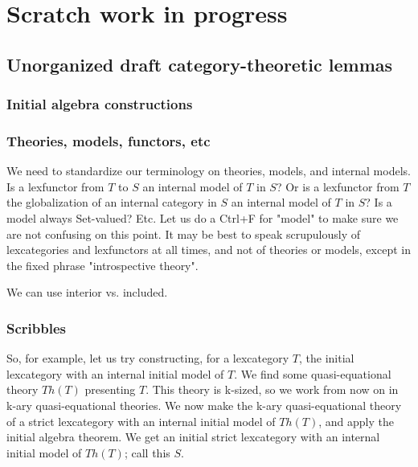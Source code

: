 \filestart

\section{Scratch work in progress}

\subsection{Unorganized draft category-theoretic lemmas}

\subsubsection{Initial algebra constructions}
\TODO

\subsubsection{Theories, models, functors, etc}
\begin{TODOblock}\label{ModelTerminology}
We need to standardize our terminology on theories, models, and internal models. Is a lexfunctor from $T$ to $S$ an internal model of $T$ in $S$? Or is a lexfunctor from $T$ the globalization of an internal category in $S$ an internal model of $T$ in $S$? Is a model always Set-valued? Etc. Let us do a Ctrl+F for "model" to make sure we are not confusing on this point. It may be best to speak scrupulously of lexcategories and lexfunctors at all times, and not of theories or models, except in the fixed phrase "introspective theory".

We can use interior vs. included.
\end{TODOblock}


\subsubsection{Scribbles}
So, for example, let us try constructing, for a lexcategory $T$, the initial lexcategory with an internal initial model of $T$. We find some quasi-equational theory $Th(T)$ presenting $T$. This theory is k-sized, so we work from now on in k-ary quasi-equational theories. We now make the k-ary quasi-equational theory of a strict lexcategory with an internal initial model of $Th(T)$, and apply the initial algebra theorem. We get an initial strict lexcategory with an internal initial model of $Th(T)$; call this $S$.


